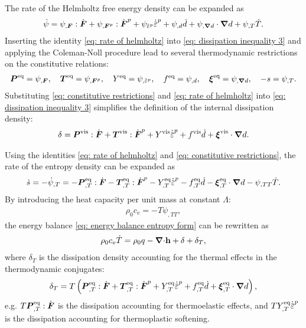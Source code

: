 The rate of the Helmholtz free energy density can be expanded as
\begin{align}
  \dot{\psi} = \psi_{,\defgrad}:\dot{\defgrad} + \psi_{,\defgrad^p}:\dot{\defgrad}^p + \psi_{\ep}\epdot + \psi_{,d}\dot{d} + \psi_{,\grad d}\cdot\grad d + \psi_{,T}\dot{T}. \label{eq: rate of helmholtz}
\end{align}
Inserting the identity \eqref{eq: rate of helmholtz} into \eqref{eq: dissipation inequality 3} and applying the Coleman-Noll procedure lead to several thermodynamic restrictions on the constitutive relations:
\begin{align}
  \bfP^\text{eq} = \psi_{,\defgrad}, \quad \bfT^\text{eq} = \psi_{,\defgrad^p}, \quad Y^\text{eq} = \psi_{,\ep}, \quad f^\text{eq} = \psi_{,d}, \quad \bs{\xi}^\text{eq} = \psi_{,\grad d}, \quad -s = \psi_{,T}. \label{eq: constitutive restrictions}
\end{align}
Substituting \eqref{eq: constitutive restrictions} and \eqref{eq: rate of helmholtz} into \eqref{eq: dissipation inequality 3} simplifies the definition of the internal dissipation density:
\begin{align}
  \delta = \bfP^\text{vis}:\dot{\defgrad} + \bfT^\text{vis}:\dot{\defgrad}^p + Y^\text{vis}\epdot + f^\text{vis}\dot{d} + \bs{\xi}^\text{vis}\cdot\grad d.
\end{align}

Using the identities \eqref{eq: rate of helmholtz} and \eqref{eq: constitutive restrictions}, the rate of the entropy density can be expanded as
\begin{align}
  \dot{s} = -\dot{\psi}_{,T} = - \bfP^\text{eq}_{,T}:\dot{\defgrad} - \bfT^\text{eq}_{,T}:\dot{\defgrad}^p - Y^\text{eq}_{,T}\epdot - f^\text{eq}_{,T}\dot{d} - \bs{\xi}^\text{eq}_{,T}\cdot\grad d - \psi_{,TT} \dot{T}. \label{eq: expanding s dot}
\end{align}
By introducing the heat capacity per unit mass at constant $\Lambda$:
\begin{align}
  \rho_0c_v = -T\psi_{,TT}, \label{eq: heat capacity}
\end{align}
the energy balance \eqref{eq: energy balance entropy form} can be rewritten as
\begin{align}
  \rho_0 c_v \dot{T} = \rho_0 q - {\boldsymbol{\nabla} \cdot} \textbf{h} + \delta + \delta_T, \label{eq: energy balance temperature form}
\end{align}
where $\delta_T$ is the dissipation density accounting for the thermal effects in the thermodynamic conjugates:
\begin{align}
  \delta_T = T\left( \bfP^\text{eq}_{,T}:\dot{\defgrad} + \bfT^\text{eq}_{,T}:\dot{\defgrad}^p + Y^\text{eq}_{,T}\epdot + f^\text{eq}_{,T}\dot{d} + \bs{\xi}^\text{eq}_{,T}\cdot\grad d \right),
\end{align}
e.g. $T\boldsymbol{P}^\text{eq}_{,T}:\dot{\boldsymbol{F}}$ is the dissipation accounting for thermoelastic effects, and $TY^\text{eq}_{,T}\epdot$ is the dissipation accounting for thermoplastic softening.
